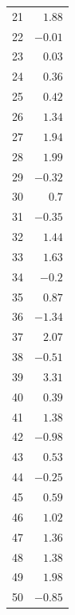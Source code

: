 \documentclass[pdftex, 11pt, a4paper, titlepage]{article}
\begin{document}
\begin{table}[H]
\begin{tabular}[t]{r|r|}
			21 & $ 1.88 $ \\ \cline{2-2}
			22 & $ -0.01 $ \\ \cline{2-2}
			23 & $ 0.03 $ \\ \cline{2-2}
			24 & $ 0.36 $ \\ \cline{2-2}
			25 & $ 0.42 $ \\ \cline{2-2}
			26 & $ 1.34 $ \\ \cline{2-2}
			27 & $ 1.94 $ \\ \cline{2-2}
			28 & $ 1.99 $ \\ \cline{2-2}
			29 & $ -0.32 $ \\ \cline{2-2}
			30 & $ 0.7 $ \\ \cline{2-2}
			31 & $ -0.35 $ \\ \cline{2-2}
			32 & $ 1.44 $ \\ \cline{2-2}
			33 & $ 1.63 $ \\ \cline{2-2}
			34 & $ -0.2 $ \\ \cline{2-2}
			35 & $ 0.87 $ \\ \cline{2-2}
			36 & $ -1.34 $ \\ \cline{2-2}
			37 & $ 2.07 $ \\ \cline{2-2}
			38 & $ -0.51 $ \\ \cline{2-2}
			39 & $ 3.31 $ \\ \cline{2-2}
			40 & $ 0.39 $ \\ \cline{2-2}
			41 & $ 1.38 $ \\ \cline{2-2}
			42 & $ -0.98 $ \\ \cline{2-2}
			43 & $ 0.53 $ \\ \cline{2-2}
			44 & $ -0.25 $ \\ \cline{2-2}
			45 & $ 0.59 $ \\ \cline{2-2}
			46 & $ 1.02 $ \\ \cline{2-2}
			47 & $ 1.36 $ \\ \cline{2-2}
			48 & $ 1.38 $ \\ \cline{2-2}
			49 & $ 1.98 $ \\ \cline{2-2}
			50 & $ -0.85 $ \\ \cline{2-2}
		\end{tabular}
	\end{table}
\end{document}
